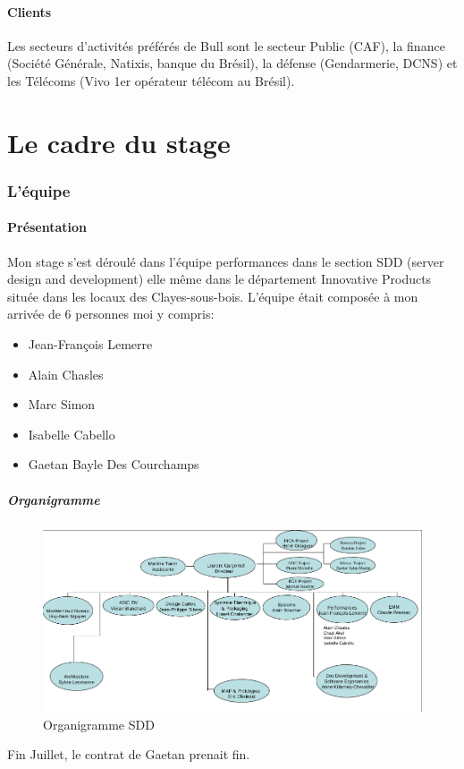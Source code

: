 \documentclass[11pt]{article}
\begin{document}
		\subsection{Clients}
			Les secteurs d'activités préférés de Bull sont le secteur Public (CAF), la finance (Société Générale, Natixis, banque du Brésil), la défense (Gendarmerie, DCNS) 
			et les Télécoms (Vivo 1er opérateur télécom au Brésil).

\newpage
{}
\part{Le cadre du stage}
	\section{L'équipe}
	\subsection{Présentation}
	Mon stage s'est déroulé dans l'équipe performances dans le section SDD (server design and development) elle même dans le département Innovative 
	Products située dans les locaux des Clayes-sous-bois. L'équipe était composée à mon arrivée de 6 personnes moi y compris:
	\begin{itemize}
	\item Jean-François Lemerre
	\item Alain Chasles
	\item Marc Simon
	\item Isabelle Cabello
	\item Gaetan Bayle Des Courchamps
	\end{itemize}
		\subsubsection{Organigramme}
		\begin{figure}[!h]
		\begin{center}
		\includegraphics[scale=0.45]{orga_sdd.png}
		\caption{\small{Organigramme SDD}}
		\end{center}
		\end{figure}
	Fin Juillet, le contrat de Gaetan prenait fin.
\end{document}
